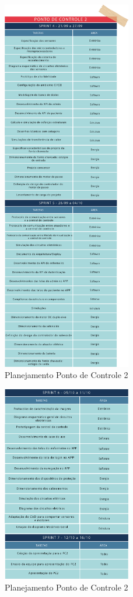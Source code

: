 \begin{apendicesenv}
\begin{figure}[H]
    \centering
    \includegraphics[width=0.5\textwidth]{figuras/gerenciamento/sprint-pc2-1.png}
    \caption{Planejamento Ponto de Controle 2}
    \label{fig:Sprint_pc2}
\end{figure}

\begin{figure}[H]
    \centering
    \includegraphics[width=0.5\textwidth]{figuras/gerenciamento/sprint-pc2-2.png}
    \caption{Planejamento Ponto de Controle 2}
    \label{fig:Sprint_pc2_1}
\end{figure}


\end{apendicesenv}
